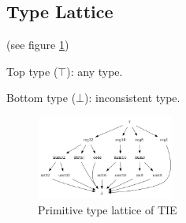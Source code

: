 
\subsection{Type Lattice}

 (see figure \ref{fig:base_type_lattice})

Top type ($\top$): any type.

Bottom type ($\bot$): inconsistent type.

\begin{figure}[htbp]
	\centering
	\includegraphics[width=0.40\textwidth]{inc/tie_primitive_type_lattice.png}
	\caption{Primitive type lattice of TIE}
	\label{fig:base_type_lattice}
\end{figure}
